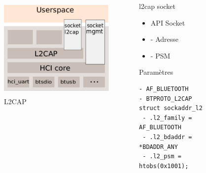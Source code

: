 \begin{frame}[fragile]
\begin{columns}[t]
\begin{column}{0.60\linewidth}
	\begin{figure}
		\includegraphics[height=5cm]{bluez_kernel_l2cap_sock.png}
		\caption{L2CAP}
	\end{figure}
\end{column}
\begin{column}{0.40\linewidth}
	\begin{block}{l2cap socket}
		\begin{itemize}
			\item API Socket
			\item - Adresse
			\item - PSM 
		\end{itemize}
	\end{block}
	\begin{block}{Paramètres}
		\begin{Verbatim}[fontsize=\tiny]
- AF_BLUETOOTH
- BTPROTO_L2CAP
struct sockaddr_l2
 - .l2_family = AF_BLUETOOTH
 - .l2_bdaddr = *BDADDR_ANY
 - .l2_psm = htobs(0x1001);
		\end{Verbatim}
	\end{block}
\end{column}
\end{columns}
\end{frame}

